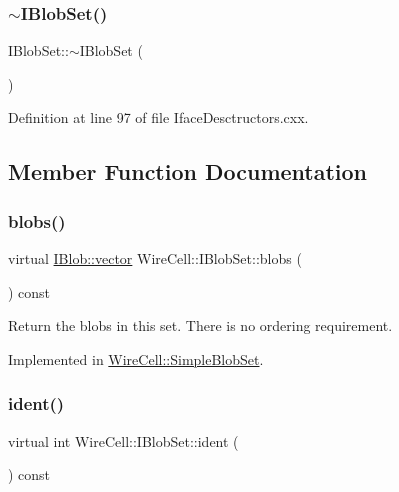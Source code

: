 \subsubsection{\texorpdfstring{$\sim$\+I\+Blob\+Set()}{~IBlobSet()}}
{\footnotesize\ttfamily I\+Blob\+Set\+::$\sim$\+I\+Blob\+Set (\begin{DoxyParamCaption}{ }\end{DoxyParamCaption})\hspace{0.3cm}{\ttfamily [virtual]}}



Definition at line 97 of file Iface\+Desctructors.\+cxx.



\subsection{Member Function Documentation}
\mbox{\label{class_wire_cell_1_1_i_blob_set_af9c19bbf4c1241ddaa3b2022129a766a}} 
\subsubsection{\texorpdfstring{blobs()}{blobs()}}
{\footnotesize\ttfamily virtual \hyperlink{class_wire_cell_1_1_i_data_ae1a9f863380499bb43f39fabb6276660}{I\+Blob\+::vector} Wire\+Cell\+::\+I\+Blob\+Set\+::blobs (\begin{DoxyParamCaption}{ }\end{DoxyParamCaption}) const\hspace{0.3cm}{\ttfamily [pure virtual]}}

Return the blobs in this set. There is no ordering requirement. 

Implemented in \hyperlink{class_wire_cell_1_1_simple_blob_set_abee0b145a6a64ebc44fc37e05191188a}{Wire\+Cell\+::\+Simple\+Blob\+Set}.

\mbox{\label{class_wire_cell_1_1_i_blob_set_a18567545bde587af9d775efd55bf39fa}} 
\subsubsection{\texorpdfstring{ident()}{ident()}}
{\footnotesize\ttfamily virtual int Wire\+Cell\+::\+I\+Blob\+Set\+::ident (\begin{DoxyParamCaption}{ }\end{DoxyParamCaption}) const\hspace{0.3cm}{\ttfamily [pure virtual]}}




